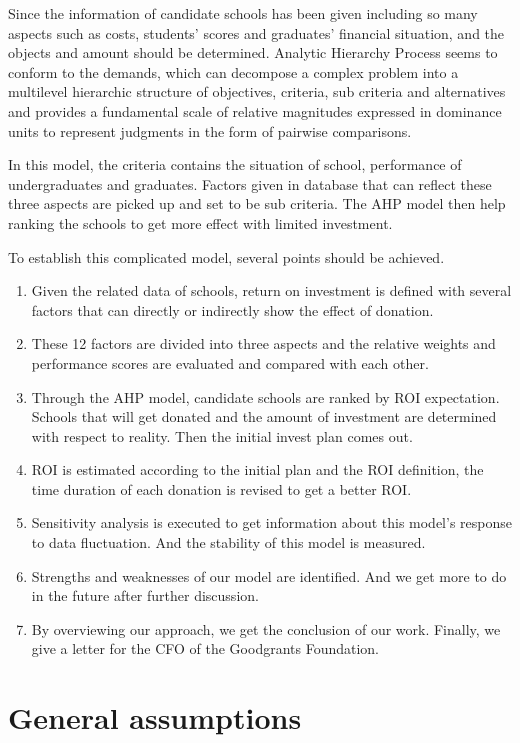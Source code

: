 	Since the information of candidate schools has been given including so many aspects such as costs, students' scores and graduates' financial situation, and the objects and amount should be determined. Analytic Hierarchy Process seems to conform to the demands, which can decompose a complex problem into a multilevel hierarchic structure of objectives, criteria, sub criteria and alternatives and provides a fundamental scale of relative magnitudes expressed in dominance units to represent judgments in the form of pairwise comparisons\cite{url2}.

In this model, the criteria contains the situation of school, performance of undergraduates and graduates. Factors given in database that can reflect these three aspects are picked up and set to be sub criteria. The AHP model then help ranking the schools to get more effect with limited investment.

To establish this complicated model, several points should be achieved.

\begin{enumerate}
	\item Given the related data of schools, return on investment is defined with several factors that can directly or indirectly show the effect of donation.
	\item These 12 factors are divided into three aspects and the relative weights and performance scores are evaluated and compared with each other.
	\item Through the AHP model, candidate schools are ranked by ROI expectation. Schools that will get donated and the amount of investment are determined with respect to reality. Then the initial invest plan comes out.
	\item ROI is estimated according to the initial plan and the ROI definition, the time duration of each donation is revised to get a better ROI.
	\item Sensitivity analysis is executed to get information about this model's response to data fluctuation. And the stability of this model is measured.
	\item Strengths and weaknesses of our model are identified. And we get more to do in the future after further discussion.
	\item By overviewing our approach, we get the conclusion of our work. Finally, we give a letter for the CFO of the Goodgrants Foundation.
\end{enumerate}


  \section{General assumptions}

